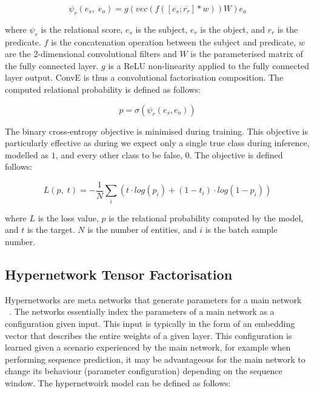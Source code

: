 \begin{equation}
	\psi_r(e_s, \; e_o) = g(vec(f(\left [ \overline{e_s}; \overline{r_r} \right ]*w))W)e_o
\end{equation}

where $\psi_r$ is the relational score, $e_s$ is the subject, $e_r$ is the object, and $r_r$ is the predicate. $f$ is the concatenation operation between the subject and predicate, $w$ are the 2-dimensional convolutional filters and $W$ is the parameterised matrix of the fully connected layer. $g$ is a ReLU non-linearity applied to the fully connected layer output. ConvE is thus a convolutional factorisation composition. The computed relational probability is defined as follows: 

\begin{equation}
	p = \sigma(\psi_r(e_s,e_o)) 
\end{equation}

The binary cross-entropy objective is minimised during training. This objective is particularly effective as during we expect only a single true class during inference, modelled as $1$, and every other class to be false, $0$. The objective is defined follows:

\begin{equation}
	L(p, \; t) =  -\frac{1}{N}\sum_i(t \cdot log(p_i) + (1 - t_i) \cdot log(1 - p_i))
\end{equation}

where $L$ is the loss value, $p$ is the relational probability computed by the model, and $t$ is the target. $N$ is the number of entities, and $i$ is the batch sample number. \newpage


\subsection{Hypernetwork Tensor Factorisation}

Hypernetworks are meta networks that generate parameters for a main network ~\citep{ha2016hypernetworks}. The networks essentially index the parameters of a main network as a configuration given input. This input is typically in the form of an embedding vector that describes the entire weights of a given layer. This configuration is learned given a scenario experienced by the main network, for example when performing sequence prediction, it may be advantageous for the main network to change its behaviour (parameter configuration) depending on the sequence window. The hypernetwoirk model can be defined as follows: 

